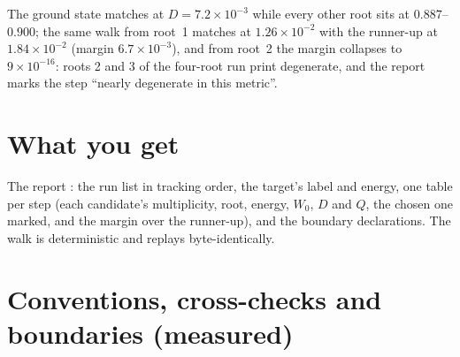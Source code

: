 The ground state matches at $D = 7.2\times10^{-3}$ while every other
root sits at $0.887$--$0.900$; the same walk from root~1 matches at
$1.26\times10^{-2}$ with the runner-up at $1.84\times10^{-2}$ (margin
$6.7\times10^{-3}$), and from root~2 the margin collapses to
$9\times10^{-16}$: roots 2 and 3 of the four-root run print degenerate,
and the report marks the step ``nearly degenerate in this metric''.

\section{What you get}

The report : the run list in tracking
order, the target's label and energy, one table per step (each candidate's
multiplicity, root, energy, $W_0$, $D$ and $Q$, the chosen one marked, and
the margin over the runner-up), and the boundary declarations.  The walk
is deterministic and replays byte-identically.

\section{Conventions, cross-checks and boundaries (measured)}

